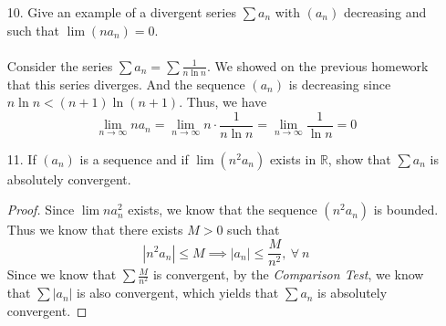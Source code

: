 \documentclass[12pt,letterpaper]{article}
\newcommand{\limx}[2]{\displaystyle\lim\limits_{#1 \to #2}}
\newcommand{\R}{\mathbb{R}}
\theoremstyle{case}
\theoremstyle{definition}
\begin{document}
\begin{enumerate}
\begin{enumerate}
\begin{proof}
\begin{align*}
					&= a_{n+1}+\dots + a_{2n-1} \\
					&\geq a_{2n-1}+\dots+a_{2n-1} \\
					&=(n-1)\cdot a_{2n} \\
					&> 0
				\end{align*}
				Notice that if we let $n>M(\varepsilon)$, then $|s_{2n}-s_n| < \varepsilon$ and $|s_{2n-1}-s_n| <\varepsilon$.
				\\\\Choose $\delta = 2M(\varepsilon)$ and for $n > \delta$, we get $n\cdot a_{2n} \cdot (n-1)\cdot a_{2n} = na_n < \varepsilon$, and thus by the definition of a limit, we have that 
				\[\limx{n}{\infty} na_n=0\]
			\end{proof}
		
			\item[10.] Give an example of a divergent series $\sum a_n$  with $(a_n)$ decreasing and such that $\lim (na_n)=0$.
			\\\\Consider the series $\sum a_n=\sum \frac{1}{n \ln n}$. We showed on the previous homework that this series diverges. And the sequence $(a_n)$ is decreasing since $n \ln n<(n+1)\ln(n+1)$. Thus, we have
			\[\limx{n}{\infty} na_n = \limx{n}{\infty} n \cdot \frac{1}{n \ln n} = \limx{n}{\infty} \frac{1}{\ln n} = 0\]
			
			\item[11.] If $(a_n)$ is a sequence and if $\lim (n^2a_n)$ exists in $\R$, show that $\sum a_n$ is absolutely convergent.
			\begin{proof}
				Since $\lim na^2_n$ exists, we know that the sequence $(n^2a_n)$ is bounded. Thus we know that there exists $M>0$ such that 
				\[|n^2a_n| \leq M \implies |a_n| \leq \frac{M}{n^2},\ \forall\ n\]
				Since we know that $\sum \frac{M}{n^2}$ is convergent, by the \textit{Comparison Test}, we know that $\sum |a_n|$ is also convergent, which yields that $\sum a_n$ is absolutely convergent.
			\end{proof}
		

\end{enumerate}
\end{enumerate}
\end{document}
